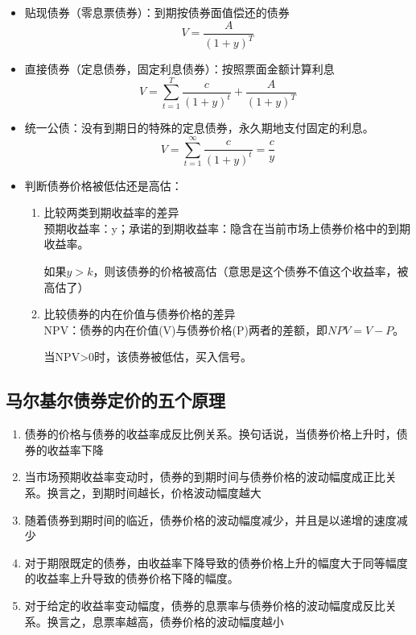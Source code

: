 \documentclass{article}
\begin{document}
\begin{itemize}
    \item 贴现债券（零息票债券）：到期按债券面值偿还的债券\\
    \[V=\frac{A}{{(1+y)}^T} \]
    \item 直接债券（定息债券，固定利息债券）：按照票面金额计算利息\\
    \[V=\sum_{t=1}^{T}\frac{c}{\left(1+y\right)^t}+\frac{A}{\left(1+y\right)^T}\]
    \item 统一公债：没有到期日的特殊的定息债券，永久期地支付固定的利息。
    \[V=\sum_{t=1}^{\infty}\frac{c}{\left(1+y\right)^t}=\frac{c}{y}\]
    \item 判断债券价格被低估还是高估：
    \begin{enumerate}
        \item 比较两类到期收益率的差异\\
        预期收益率：y；承诺的到期收益率：隐含在当前市场上债券价格中的到期收益率。

        如果$y>k$，则该债券的价格被高估（意思是这个债券不值这个收益率，被高估了）
        \item 比较债券的内在价值与债券价格的差异\\
        NPV：债券的内在价值(V)与债券价格(P)两者的差额，即$NPV=V-P$。

        当NPV>0时，该债券被低估，买入信号。
    \end{enumerate}
\end{itemize}
\subsection*{马尔基尔债券定价的五个原理}
    \begin{enumerate}
        \item 债券的价格与债券的收益率成反比例关系。换句话说，当债券价格上升时，债券的收益率下降
        \item 当市场预期收益率变动时，债券的到期时间与债券价格的波动幅度成正比关系。换言之，到期时间越长，价格波动幅度越大
        \item 随着债券到期时间的临近，债券价格的波动幅度减少，并且是以递增的速度减少
        \item 对于期限既定的债券，由收益率下降导致的债券价格上升的幅度大于同等幅度的收益率上升导致的债券价格下降的幅度。
        \item 对于给定的收益率变动幅度，债券的息票率与债券价格的波动幅度成反比关系。换言之，息票率越高，债券价格的波动幅度越小
    \end{enumerate}
\clearpage
\end{document}
